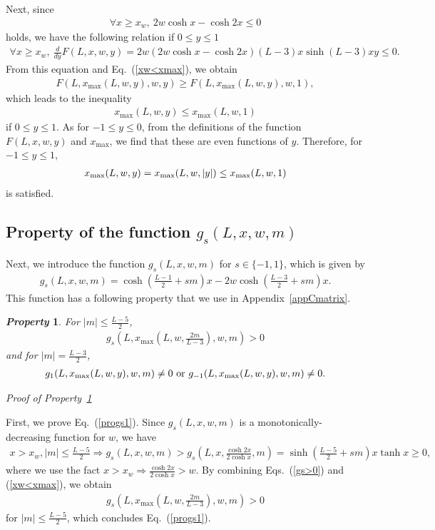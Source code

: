 \documentclass[prl,twocolumn,superscriptaddress,nofootinbib]{revtex4}
\newtheorem{property}{{\it \bf Property}}
\def\U#1{{\rm #1}}
\begin{document}
\begin{widetext}
Next, since
\begin{align}
\forall x\geq x_w,~2w\cosh{x}-\cosh{2x}\leq 0
\end{align}
holds, we have the following relation if $0\leq y\leq1$
\begin{align}
\forall x\geq x_w,~\frac{d}{dy}F(L,x,w,y)=2w(2w\cosh{x}-\cosh{2x})(L-3)x\sinh{(L-3)xy}\leq0.
  \end{align}
From this equation and Eq.~(\ref{xw<xmax}), we obtain
\begin{align}
F(L,x_{\max}(L,w,y),w,y)\geq F(L,x_{\max}(L,w,y),w,1),
\end{align}
which leads to the inequality
\begin{align}
x_{\max}(L,w,y)\le x_{\max}(L,w,1)
  \label{max:y1}
\end{align}
if $0\leq y\leq1$. 
As for $-1\leq y\leq 0$, from the definitions of the function $F(L,x,w,y)$ and
$x_{\max}$, we find that these are even functions of $y$.
Therefore, for $-1\leq y\leq1$,
\begin{align}
x_{\U{max}}(L,w,y)=x_{\U{max}}(L,w,|y|)\le x_{\max}(L,w,1)
\end{align}
is satisfied. 



\subsection{Property of the function $g_s(L,x,w,m)$}
Next, we introduce the function $g_s(L,x,w,m)$ for $s\in\{-1,1\}$, which is given by
\begin{align}
  g_s(L,x,w,m)=\cosh\left(\frac{L-1}{2}+sm\right)x-2w\cosh\left(\frac{L-3}{2}+sm\right)x.
  \label{gs}
\end{align}
This function has a following property that we use in Appendix~\ref{appCmatrix}. 
\begin{property}
  \label{progs}
For $|m|\leq \frac{L-5}{2}$, 
  \begin{align}
    g_s\left(L,x_{\max}\left(L,w,\frac{2m}{L-3}\right),w,m\right)>0
    \label{progs1}
  \end{align}
and for $|m|=\frac{L-3}{2}$, 
  \begin{align}
    g_1(L,x_{\max}(L,w,y),w,m)\neq0~\U{or}~g_{-1}(L,x_{\max}(L,w,y),w,m)\neq0.
        \label{progs2}
  \end{align}
\end{property}
    {\it Proof of Property~\ref{progs}}

    First, we prove Eq.~(\ref{progs1}). 
    Since $g_s(L,x,w,m)$ is a monotonically-decreasing function for $w$, we have
\begin{align}
  x>x_w,|m|\leq\frac{L-5}{2}\Rightarrow g_s(L,x,w,m)>
  g_s\left(L,x,\frac{\cosh{2x}}{2\cosh{x}},m\right)=\sinh\left(\frac{L-5}{2}+sm\right)x\tanh{x}\geq0,
  \label{gs>0}
  \end{align}
where we use the fact $x>x_w\Rightarrow \frac{\cosh{2x}}{2\cosh{x}}>w$.
By combining Eqs.~(\ref{gs>0}) and (\ref{xw<xmax}), we obtain 
\begin{align}
g_s\left(L,x_{\max}\left(L,w,\frac{2m}{L-3}\right),w,m\right)>0
\end{align}
for $|m|\leq\frac{L-5}{2}$, which concludes Eq.~(\ref{progs1}).


\end{widetext}
\end{document}
